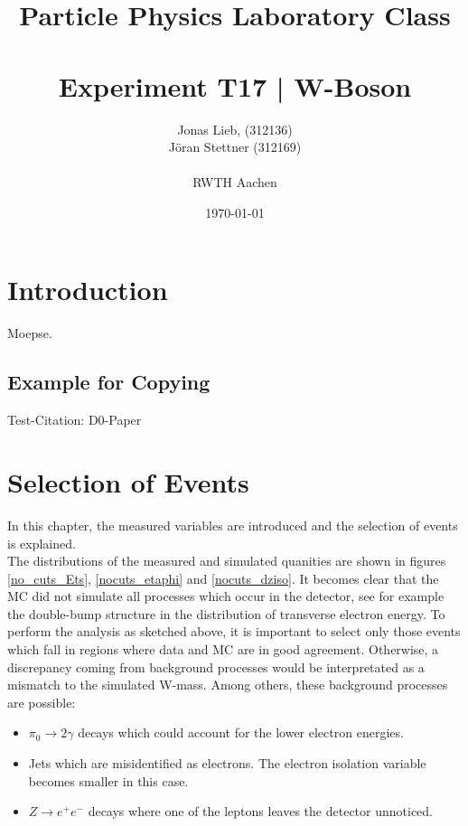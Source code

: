 \documentclass[
	paper=A4,
	parskip=full,
	chapterprefix=true,
	11pt,
	headings=normal,
	bibliography=totoc,
	listof=totoc,
	titlepage=on,
]{scrreprt}
\date{\today}
\title{Particle Physics Laboratory Class \\ \quad \\ Experiment T17 | W-Boson }
\author{Jonas Lieb, (312136) \\ Jöran Stettner (312169) \\ \\  RWTH Aachen}
\begin{document}
\maketitle

\cleardoublepage

\setcounter{tocdepth}{2}
\tableofcontents

\cleardoublepage

\chapter{Introduction}
Moepse.

\section{Example for Copying}


Test-Citation: D0-Paper \cite{PhysRevLett.77.3309}



\chapter{Selection of Events}
In this chapter, the measured variables are introduced and the selection of events is explained. \\
The distributions of the measured and simulated quanities are shown in figures \ref{no_cuts_Ets}, \ref{nocuts_etaphi} and \ref{nocuts_dziso}. It becomes clear that the MC did not simulate all processes which occur in the detector, see for example the double-bump structure in the distribution of transverse electron energy. To perform the analysis as sketched above, it is important to select only those events which fall in regions where data and MC are in good agreement. Otherwise, a discrepancy coming from background processes would be interpretated as a mismatch to the simulated W-mass. Among others, these background processes are possible: 
\begin{itemize}
\item $\pi_0 \rightarrow 2 \gamma$ decays which could account for the lower electron energies.
\item Jets which are misidentified as electrons. The electron isolation variable becomes smaller in this case.
\item $Z \rightarrow e^{+} e^{-}$ decays where one of the leptons leaves the detector unnoticed.
\end{itemize}
\end{document}
